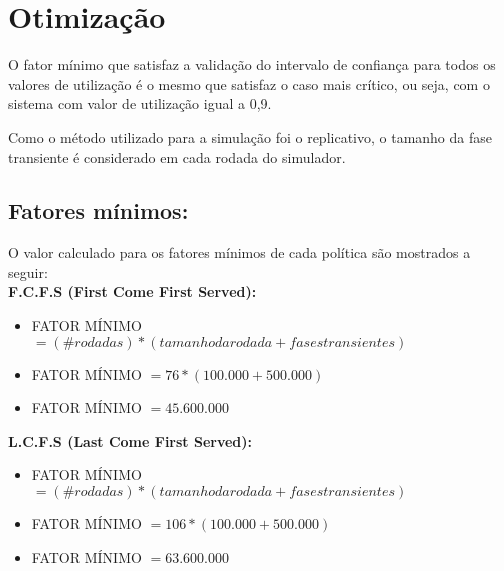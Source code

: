 \chapter{Otimização}

O fator mínimo que satisfaz a validação do intervalo de confiança para todos os valores de utilização é o mesmo que satisfaz o caso mais crítico, ou seja, com o sistema com valor de utilização igual a 0,9.

Como o método utilizado para a simulação foi o replicativo, o tamanho da fase transiente é considerado em cada rodada do simulador.

\section{Fatores mínimos:}
\label{sec:fatores}

O valor calculado para os fatores mínimos de cada política são mostrados a seguir:\\

\textbf{F.C.F.S (First Come First Served):}
\begin{itemize}
  \item FATOR MÍNIMO $= (\# rodadas) * (tamanho da rodada + fases transientes)$
  \item FATOR MÍNIMO $= 76 * (100.000 + 500.000)$
  \item FATOR MÍNIMO $= 45.600.000$
\end{itemize}

\textbf{L.C.F.S (Last Come First Served):}
\begin{itemize}
  \item FATOR MÍNIMO $= (\# rodadas) * (tamanho da rodada + fases transientes)$
  \item FATOR MÍNIMO $= 106 * (100.000 + 500.000)$
  \item FATOR MÍNIMO $= 63.600.000$
\end{itemize}
